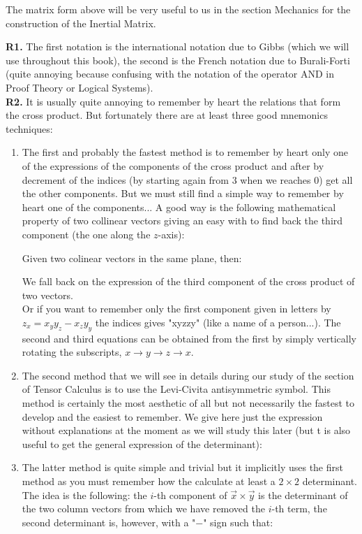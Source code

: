 	The matrix form above will be very useful to us in the section Mechanics for the construction of the Inertial Matrix.
	\begin{tcolorbox}[title=Remarks,colframe=black,arc=10pt]
	\textbf{R1.} The first notation is the international notation due to Gibbs (which we will use throughout this book), the second is the French notation due to Burali-Forti (quite annoying because confusing with the notation of the operator AND in Proof Theory or Logical Systems).\\
	
	\textbf{R2.} It is usually quite annoying to remember by heart the relations that form the cross product. But fortunately there are at least three good mnemonics techniques:
	\begin{enumerate}

		\item The first and probably the fastest method is to remember by heart only one of the expressions of the components of the cross product and after by decrement of the indices (by starting again from $3$ when we reaches $0$) get all the other components. But we must still find a simple way to remember by heart one of the components... A good way is the following mathematical property of two collinear vectors giving an easy with to find back the third component (the one along the $z$-axis):
		
		Given two colinear vectors in the same plane, then:
		
		We fall back on the expression of the third component of the cross product of two vectors.\\
		
		Or if you want to remember only the first component given in letters by $z_x = x_y y_z - x_z y_y$ the indices gives "xyzzy" (like a name of a person...). The second and third equations can be obtained from the first by simply vertically rotating the subscripts, $x\rightarrow y \rightarrow  z \rightarrow x$. 
		
		\item The second method that we will see in details during our study of the section of Tensor Calculus is to use the Levi-Civita antisymmetric symbol. This method is certainly the most aesthetic of all but not necessarily the fastest to develop and the easiest to remember. We give here just the expression without explanations at the moment as we will study this later (but t is also useful to get the general expression of the determinant):
		
		
		\item The latter method is quite simple and trivial but it implicitly uses the first method as you must remember how the calculate at least a $2\times 2$ determinant. The idea is the following: the $i$-th component of $\vec{x}\times\vec{y}$ is the determinant of the two column vectors from which we have removed the $i$-th term, the second determinant is, however, with a "$-$" sign such that:
			  
	\end{enumerate}
	\end{tcolorbox}
	
